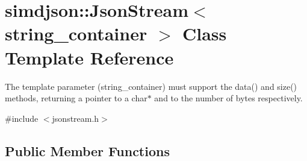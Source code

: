 \hypertarget{classsimdjson_1_1_json_stream}{}\section{simdjson\+:\+:Json\+Stream$<$ string\+\_\+container $>$ Class Template Reference}
\label{classsimdjson_1_1_json_stream}


The template parameter (string\+\_\+container) must support the data() and size() methods, returning a pointer to a char$\ast$ and to the number of bytes respectively.  




{\ttfamily \#include $<$jsonstream.\+h$>$}

\subsection*{Public Member Functions}
